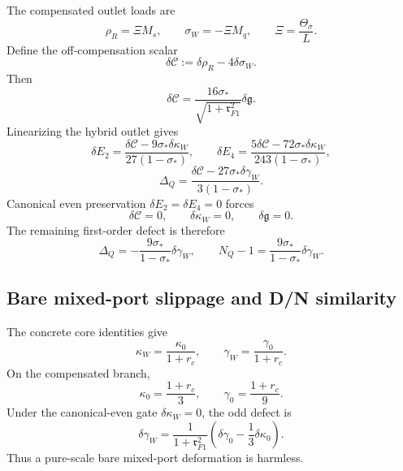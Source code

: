 The compensated outlet loads are
\begin{equation}
\rho_R=\Xi M_s,
\qquad
\sigma_W=-\Xi M_q,
\qquad
\Xi=\frac{\Theta_\sigma}{L}.
\end{equation}
Define the off-compensation scalar
\begin{equation}
\label{eq:part04-deltaC-def}
\delta\mathcal C:=\delta\rho_R-4\delta\sigma_W.
\end{equation}
Then
\begin{equation}
\label{eq:part04-deltaC-deltag}
\delta\mathcal C
=
\frac{16\sigma_*}{\sqrt{1+\mathfrak r_{F1}^2}}\delta\mathfrak g.
\end{equation}
Linearizing the hybrid outlet gives
\begin{equation}
\label{eq:part04-outlet-defects-linear}
\delta E_2=\frac{\delta\mathcal C-9\sigma_*\delta\kappa_W}{27(1-\sigma_*)},
\qquad
\delta E_4=\frac{5\delta\mathcal C-72\sigma_*\delta\kappa_W}{243(1-\sigma_*)},
\end{equation}
\begin{equation}
\label{eq:part04-DeltaQ-hybrid-linear}
\Delta_Q=\frac{\delta\mathcal C-27\sigma_*\delta\gamma_W}{3(1-\sigma_*)}.
\end{equation}
Canonical even preservation \(\delta E_2=\delta E_4=0\) forces
\begin{equation}
\label{eq:part04-even-gate-forces}
\delta\mathcal C=0,
\qquad
\delta\kappa_W=0,
\qquad
\delta\mathfrak g=0.
\end{equation}
The remaining first-order defect is therefore
\begin{equation}
\label{eq:part04-DeltaQ-deltagammaW}
\Delta_Q=-\frac{9\sigma_*}{1-\sigma_*}\delta\gamma_W,
\qquad
N_Q-1=\frac{9\sigma_*}{1-\sigma_*}\delta\gamma_W.
\end{equation}

\subsection{Bare mixed-port slippage and D/N similarity}
\label{subsec:part04-bare-slippage}

The concrete core identities give
\begin{equation}
\kappa_W=\frac{\kappa_0}{1+r_c},
\qquad
\gamma_W=\frac{\gamma_0}{1+r_c}.
\end{equation}
On the compensated branch,
\begin{equation}
\kappa_0=\frac{1+r_c}{3},
\qquad
\gamma_0=\frac{1+r_c}{9}.
\end{equation}
Under the canonical-even gate \(\delta\kappa_W=0\), the odd defect is
\begin{equation}
\label{eq:part04-delta-gammaW-bare-slippage}
\delta\gamma_W
=
\frac{1}{1+\mathfrak r_{F1}^2}
\left(\delta\gamma_0-\frac13\delta\kappa_0\right).
\end{equation}
Thus a pure-scale bare mixed-port deformation is harmless.


